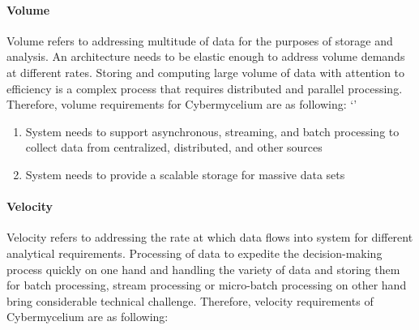 \documentclass{bmcart}
\begin{document}
        
        
  



\paragraph{Volume}

Volume refers to addressing multitude of data for the purposes of storage and analysis. An architecture needs to be elastic enough to address volume demands at different rates. Storing and computing large volume of data with attention to efficiency is a complex process that requires distributed and parallel processing. Therefore, volume requirements for Cybermycelium are as following:
`'

\begin{enumerate}[label=\textbf{Vol-\arabic*}]
    \item System needs to support asynchronous, streaming, and batch processing to collect data from centralized, distributed, and other sources
    \item System needs to provide a scalable storage for massive data sets
\end{enumerate}


\paragraph{Velocity}

Velocity refers to addressing the rate at which data flows into system for different analytical requirements. Processing of data to expedite the decision-making process quickly on one hand and handling the variety of data and storing them for batch processing, stream processing or micro-batch processing on other hand bring considerable technical challenge. Therefore, velocity requirements of Cybermycelium are as following: 
\end{document}
